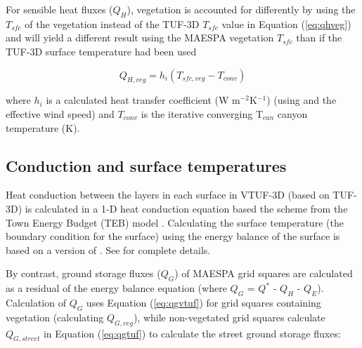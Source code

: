 \documentclass[final,3p,times,authoryear]{elsarticle}
\begin{document}





For sensible heat fluxes ($Q_{H}$), vegetation is accounted for differently by using the $T_{sfc}$ of the vegetation instead of the TUF-3D $T_{sfc}$ value in Equation (\ref{eq:qhveg}) and will yield a different result using the MAESPA vegetation $T_{sfc}$ than if the TUF-3D surface temperature had been used

\begin{equation}\label{eq:qhveg}
 Q_{H,veg} = h_{i}  (T_{sfc,veg}-T_{conv}) 
\end{equation}

where $h_{i}$ is a calculated heat transfer coefficient (W m$^{-2}$K$^{-1}$) (using \cite{Mascart1995} and the effective wind speed) and $T_{conv}$ is the iterative converging T$_{can}$ canyon temperature (K).


\subsection{Conduction and surface temperatures}

Heat conduction between the layers in each surface in VTUF-3D (based on TUF-3D) is calculated in a 1-D heat conduction equation based the scheme from the Town Energy Budget (TEB) model \citep{Masson2000}. Calculating the surface temperature (the boundary condition for the surface) using the energy balance of the surface is based on a version of \cite{Arnfield1990}. See \cite{Krayenhoff2007} for complete details.


By contrast, ground storage fluxes ($Q_{G}$) of MAESPA grid squares are calculated as a residual of the energy balance equation (where $Q_{G}$ = $Q^{*}$ - $Q_{H}$ - $Q_{E}$). Calculation of $Q_{G}$ uses Equation (\ref{eq:qgvtuf}) for grid squares containing vegetation (calculating $Q_{G,veg}$), while non-vegetated grid squares calculate $Q_{G,street}$ in Equation (\ref{eq:qgtuf}) to calculate the street ground storage fluxes:
\end{document}
